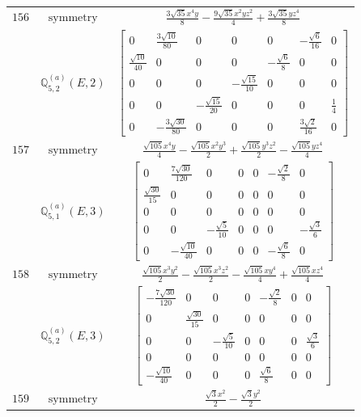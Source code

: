 \documentclass[fleqn,8pt,landscape]{jsarticle}
\begin{document}
\begin{longtable}{ccc}
$ 156 $ & $ \text{symmetry} $ & $ \frac{3 \sqrt{35} x^{4} y}{8} - \frac{9 \sqrt{35} x^{2} y z^{2}}{4} + \frac{3 \sqrt{35} y z^{4}}{8} $ \\
$  $ & $ \mathbb{Q}_{5,2}^{(a)}(E,2) $ & $ \begin{bmatrix} 0 & \frac{3 \sqrt{10}}{80} & 0 & 0 & 0 & - \frac{\sqrt{6}}{16} & 0 \\ \frac{\sqrt{10}}{40} & 0 & 0 & 0 & - \frac{\sqrt{6}}{8} & 0 & 0 \\ 0 & 0 & 0 & - \frac{\sqrt{15}}{10} & 0 & 0 & 0 \\ 0 & 0 & - \frac{\sqrt{15}}{20} & 0 & 0 & 0 & \frac{1}{4} \\ 0 & - \frac{3 \sqrt{30}}{80} & 0 & 0 & 0 & \frac{3 \sqrt{2}}{16} & 0 \end{bmatrix} $ \\ \hline
$ 157 $ & $ \text{symmetry} $ & $ \frac{\sqrt{105} x^{4} y}{4} - \frac{\sqrt{105} x^{2} y^{3}}{2} + \frac{\sqrt{105} y^{3} z^{2}}{2} - \frac{\sqrt{105} y z^{4}}{4} $ \\
$  $ & $ \mathbb{Q}_{5,1}^{(a)}(E,3) $ & $ \begin{bmatrix} 0 & \frac{7 \sqrt{30}}{120} & 0 & 0 & 0 & - \frac{\sqrt{2}}{8} & 0 \\ \frac{\sqrt{30}}{15} & 0 & 0 & 0 & 0 & 0 & 0 \\ 0 & 0 & 0 & 0 & 0 & 0 & 0 \\ 0 & 0 & - \frac{\sqrt{5}}{10} & 0 & 0 & 0 & - \frac{\sqrt{3}}{6} \\ 0 & - \frac{\sqrt{10}}{40} & 0 & 0 & 0 & - \frac{\sqrt{6}}{8} & 0 \end{bmatrix} $ \\ \hline
$ 158 $ & $ \text{symmetry} $ & $ \frac{\sqrt{105} x^{3} y^{2}}{2} - \frac{\sqrt{105} x^{3} z^{2}}{2} - \frac{\sqrt{105} x y^{4}}{4} + \frac{\sqrt{105} x z^{4}}{4} $ \\
$  $ & $ \mathbb{Q}_{5,2}^{(a)}(E,3) $ & $ \begin{bmatrix} - \frac{7 \sqrt{30}}{120} & 0 & 0 & 0 & - \frac{\sqrt{2}}{8} & 0 & 0 \\ 0 & \frac{\sqrt{30}}{15} & 0 & 0 & 0 & 0 & 0 \\ 0 & 0 & - \frac{\sqrt{5}}{10} & 0 & 0 & 0 & \frac{\sqrt{3}}{6} \\ 0 & 0 & 0 & 0 & 0 & 0 & 0 \\ - \frac{\sqrt{10}}{40} & 0 & 0 & 0 & \frac{\sqrt{6}}{8} & 0 & 0 \end{bmatrix} $ \\ \hline
$ 159 $ & $ \text{symmetry} $ & $ \frac{\sqrt{3} x^{2}}{2} - \frac{\sqrt{3} y^{2}}{2} $ \\

\end{longtable}
\end{document}
